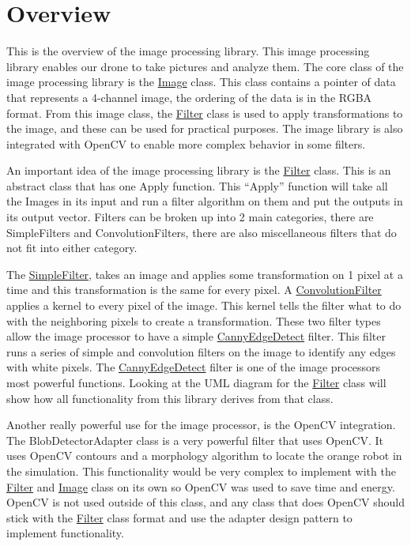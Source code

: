 \hypertarget{image_processing_description_image_processing_section}{}\section{Overview}\label{image_processing_description_image_processing_section}
This is the overview of the image processing library. This image processing library enables our drone to take pictures and analyze them. The core class of the image processing library is the \hyperlink{classImage}{Image} class. This class contains a pointer of data that represents a 4-\/channel image, the ordering of the data is in the R\+G\+BA format. From this image class, the \hyperlink{classFilter}{Filter} class is used to apply transformations to the image, and these can be used for practical purposes. The image library is also integrated with Open\+CV to enable more complex behavior in some filters.

An important idea of the image processing library is the \hyperlink{classFilter}{Filter} class. This is an abstract class that has one Apply function. This “\+Apply” function will take all the Images in its input and run a filter algorithm on them and put the outputs in its output vector. Filters can be broken up into 2 main categories, there are Simple\+Filters and Convolution\+Filters, there are also miscellaneous filters that do not fit into either category.

The \hyperlink{classSimpleFilter}{Simple\+Filter}, takes an image and applies some transformation on 1 pixel at a time and this transformation is the same for every pixel. A \hyperlink{classConvolutionFilter}{Convolution\+Filter} applies a kernel to every pixel of the image. This kernel tells the filter what to do with the neighboring pixels to create a transformation. These two filter types allow the image processor to have a simple \hyperlink{classCannyEdgeDetect}{Canny\+Edge\+Detect} filter. This filter runs a series of simple and convolution filters on the image to identify any edges with white pixels. The \hyperlink{classCannyEdgeDetect}{Canny\+Edge\+Detect} filter is one of the image processors most powerful functions. Looking at the U\+ML diagram for the \hyperlink{classFilter}{Filter} class will show how all functionality from this library derives from that class.

Another really powerful use for the image processor, is the Open\+CV integration. The Blob\+Detector\+Adapter class is a very powerful filter that uses Open\+CV. It uses Open\+CV contours and a morphology algorithm to locate the orange robot in the simulation. This functionality would be very complex to implement with the \hyperlink{classFilter}{Filter} and \hyperlink{classImage}{Image} class on its own so Open\+CV was used to save time and energy. Open\+CV is not used outside of this class, and any class that does Open\+CV should stick with the \hyperlink{classFilter}{Filter} class format and use the adapter design pattern to implement functionality.

